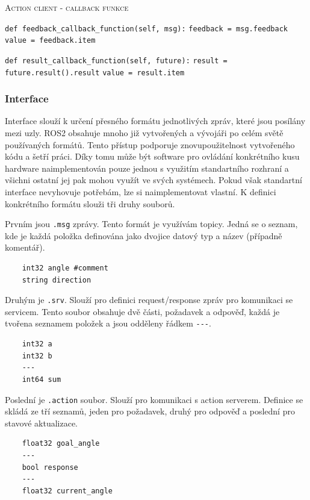 \begin{algorithm}[h!]
	\label{}
	\caption{\textsc{Action client - callback funkce}}
	
	\DontPrintSemicolon
	\SetAlgoNoLine
	\SetNlSty{}{}{:}
	\SetNlSkip{-1.1em}
	
	\BlankLine \Indp\Indpp
	
	\BlankLine
	\texttt{def feedback\_callback\_function(self, msg):}\;
	\Indp\Indp
	\texttt{feedback = msg.feedback}\;
	\texttt{value = feedback.item}\;
	\Indm\Indm
	
	\BlankLine
	\texttt{def result\_callback\_function(self, future):}\;
	\Indp\Indp
	\texttt{result = future.result().result}\;
	\texttt{value = result.item}\;
	
\end{algorithm}

\subsubsection*{Interface}
Interface slouží k určení přesného formátu jednotlivých zpráv, které jsou posílány mezi uzly. ROS2 obsahuje mnoho již vytvořených a vývojáři po celém světě používaných formátů. Tento přístup podporuje znovupoužitelnost vytvořeného kódu a šetří práci. Díky tomu může být software pro ovládání konkrétního kusu hardware naimplementován pouze jednou s využitím standartního rozhraní a všichni ostatní jej pak mohou využít ve svých systémech.
Pokud však standartní interface nevyhovuje potřebám, lze si naimplementovat vlastní. K definici konkrétního formátu slouži tři druhy souborů. \cite{ros2_introduction}

Prvním jsou \verb|.msg| zprávy. Tento formát je využívám topicy. Jedná se o seznam, kde je každá položka definována jako dvojice datový typ a název (případně komentář).
\begin{verbatim}
	int32 angle #comment
	string direction
\end{verbatim}

Druhým je \verb|.srv|. Slouží pro definici request/response zpráv pro komunikaci se servicem. Tento soubor obsahuje dvě části, požadavek a odpověď, každá je tvořena seznamem položek a jsou odděleny řádkem \verb|---|. 
\begin{verbatim}
	int32 a
	int32 b
	---
	int64 sum
\end{verbatim}

Poslední je \verb|.action| soubor. Slouží pro komunikaci s action serverem. Definice se skládá ze tří seznamů, jeden pro požadavek, druhý pro odpověď a poslední pro stavové aktualizace.
\begin{verbatim}
	float32 goal_angle
	---
	bool response
	---
	float32 current_angle
\end{verbatim}

